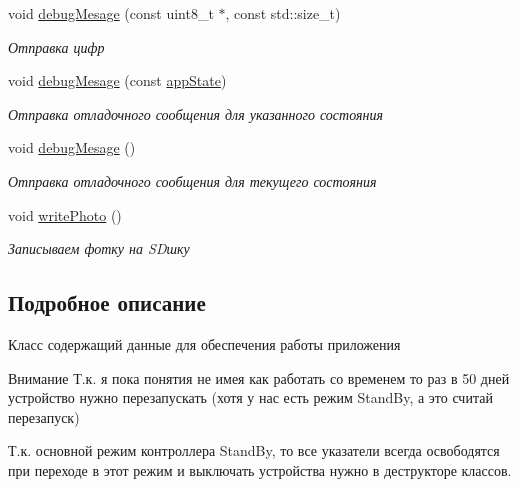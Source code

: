 \begin{DoxyCompactItemize}
void \hyperlink{classapp_1_1_t_application_a0c44fe0e56bc2d85720155880c9b54a6}{debug\+Mesage} (const uint8\+\_\+t $\ast$, const std\+::size\+\_\+t)
\begin{DoxyCompactList}\small\item\em Отправка цифр \end{DoxyCompactList}\item 
void \hyperlink{classapp_1_1_t_application_af84d71d883cf0745649afe65d70d290c}{debug\+Mesage} (const \hyperlink{group___xD0_x9F_xD0_xB5_xD1_x80_xD0_xB5_xD1_x87_xD0_xB8_xD1_x81_xD0_xBB_xD0_xB5_xD0_xBD_xD0_xB8_xD1_x8F_ga290e8080c661e52c2f685fd4af148acf}{app\+State})
\begin{DoxyCompactList}\small\item\em Отправка отладочного сообщения для указанного состояния \end{DoxyCompactList}\item 
\mbox{\label{classapp_1_1_t_application_a584149b4858ba39e49970f0031689ba7}} 
void \hyperlink{classapp_1_1_t_application_a584149b4858ba39e49970f0031689ba7}{debug\+Mesage} ()
\begin{DoxyCompactList}\small\item\em Отправка отладочного сообщения для текущего состояния \end{DoxyCompactList}\item 
\mbox{\label{classapp_1_1_t_application_a2976114a4d6cb5ae83b28459e7a2aa70}} 
void \hyperlink{classapp_1_1_t_application_a2976114a4d6cb5ae83b28459e7a2aa70}{write\+Photo} ()
\begin{DoxyCompactList}\small\item\em Записываем фотку на SD\textquotesingle{}шку \end{DoxyCompactList}\end{DoxyCompactItemize}


\subsection{Подробное описание}
Класс содержащий данные для обеспечения работы приложения 

\begin{DoxyAttention}{Внимание}
Т.\+к. я пока понятия не имея как работать со временем то раз в 50 дней устройство нужно перезапускать (хотя у нас есть режим Stand\+By, а это считай перезапуск) 

Т.\+к. основной режим контроллера Stand\+By, то все указатели всегда освободятся при переходе в этот режим и выключать устройства нужно в деструкторе классов. 
\end{DoxyAttention}



